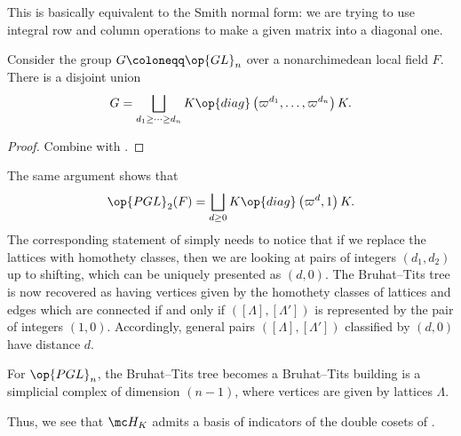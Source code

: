 \documentclass[../notes.tex]{subfiles}
\begin{document}
\begin{remark}
	This is basically equivalent to the Smith normal form: we are trying to use integral row and column operations to make a given matrix into a diagonal one.
\end{remark}
\begin{corollary} \label{cor:cartan-decomp}
	Consider the group $G\coloneqq\op{GL}_n$ over a nonarchimedean local field $F$. There is a disjoint union
	\[G=\bigsqcup_{d_1\ge\cdots\ge d_n}K\op{diag}\left(\varpi^{d_1},\ldots,\varpi^{d_n}\right)K.\]
\end{corollary}
\begin{proof}
	Combine  with .
\end{proof}
\begin{remark}
	The same argument shows that
	\[\op{PGL}_2(F)=\bigsqcup_{d\ge0}K\op{diag}\left(\varpi^d,1\right)K.\]
	The corresponding statement of  simply needs to notice that if we replace the lattices with homothety classes, then we are looking at pairs of integers $(d_1,d_2)$ up to shifting, which can be uniquely presented as $(d,0)$. The Bruhat--Tits tree is now recovered as having vertices given by the homothety classes of lattices and edges which are connected if and only if $([\Lambda],[\Lambda'])$ is represented by the pair of integers $(1,0)$. Accordingly, general pairs $([\Lambda],[\Lambda'])$ classified by $(d,0)$ have distance $d$.
\end{remark}
\begin{remark}
	For $\op{PGL}_n$, the Bruhat--Tits tree becomes a Bruhat--Tits building is a simplicial complex of dimension $(n-1)$, where vertices are given by lattices $\Lambda$.
\end{remark}
Thus, we see that $\mc H_K$ admits a basis of indicators of the double cosets of .
\end{document}
